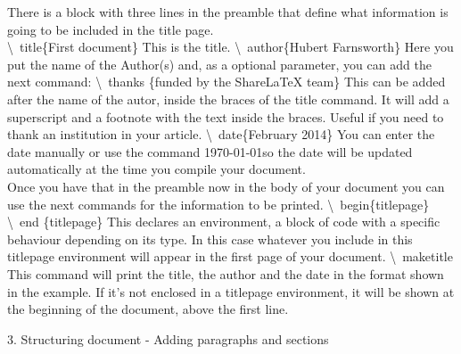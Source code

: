 \documentclass[onecolumn,journal] {IEEEtran}
\begin{document}
\begin{flushleft}
There is a block with three lines in the preamble that define what information is going to be included in the title page. \\

\textbackslash \ title\{First document\} 
\newline
This is the title.
\newline
\newpage
\textbackslash \  author\{Hubert Farnsworth\} 
\newline
 Here you put the name of the Author(s) and, as a optional parameter, you can add the next command: 
\newline
\newline
\textbackslash \ thanks \{funded by the ShareLaTeX team\}
This can be added after the name of the autor, inside the braces of the title command. It will add a superscript and a footnote with the text inside the braces. Useful if you need to thank an institution in your article. 
\newline
\newline
\textbackslash \ date\{February 2014\}
You can enter the date manually or use the command \today so the date will be updated automatically at the time you compile your document. \\


Once you have that in the preamble now in the body of your document you can use the next commands for the information to be printed. 
\newline
\newline
\textbackslash \ begin\{titlepage\}  \textbackslash \ end \{titlepage\}
This declares an environment, a block of code with a specific behaviour depending on its type. In this case whatever you include in this titlepage environment will appear in the first page of your document. 
\newline
\newline
\textbackslash \ maketitle \\ This command will print the title, the author and the date in the format shown in the example. If it's not enclosed in a titlepage environment, it will be shown at the beginning of the document, above the first line. 
\newline
\newline
\begin{Large}
3. Structuring  document - Adding paragraphs and sections
\end{Large}
\newline


\end{flushleft}
\end{document}
